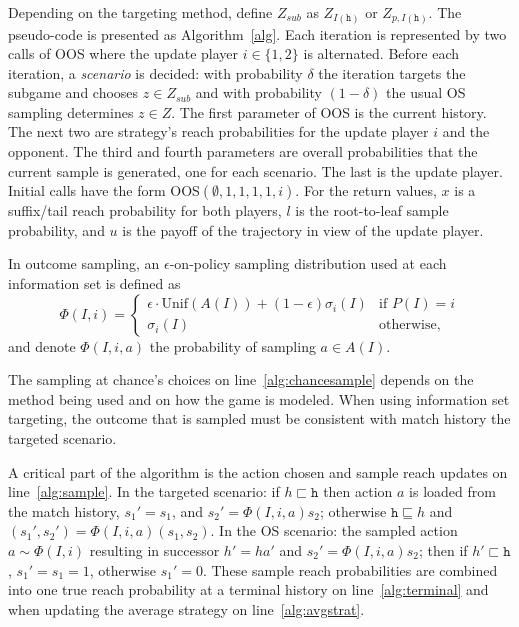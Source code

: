 \documentclass[letterpaper]{article}
\newcommand{\tth}{\mathtt{h}}
\begin{document}
Depending on the targeting method, define $Z_{sub}$ as $Z_{I(\tth)}$ or $Z_{p,I(\tth)}$. 
The pseudo-code is presented as Algorithm~\ref{alg}. 
Each iteration is represented by two calls of OOS where the update player $i \in \{1,2\}$ is alternated. 
Before each iteration, a {\it scenario} is decided: 
with probability $\delta$ the iteration targets the subgame and chooses $z \in Z_{sub}$
and with probability $(1-\delta)$ the usual OS sampling determines $z \in Z$. 
The first parameter of OOS is the current history. 
The next two are strategy's reach probabilities for the update player $i$ and the opponent. 
The third and fourth parameters are overall probabilities that the current sample is generated, one for each scenario. 
The last is the update player. Initial calls have the form OOS$(\emptyset, 1, 1, 1, 1, i)$.  
For the return values, $x$ is a suffix/tail reach probability for both players, 
$l$ is the root-to-leaf sample probability, and $u$ is the payoff of the trajectory in view 
of the update player. 

In outcome sampling, an $\epsilon$-on-policy sampling distribution used at each information set
is defined as 
\begin{equation*}
\label{eq:ossample}
\Phi(I,i) = \left\{
\begin{array}{ll}
\epsilon \cdot \mbox{Unif}(A(I)) + (1-\epsilon)\sigma_i(I) & \mbox{if } P(I) = i\\ 
\sigma_i(I)                                          & \mbox{otherwise,}
\end{array} \right.
\end{equation*}
and denote $\Phi(I,i,a)$ the probability of sampling $a \in A(I)$. 

The sampling at chance's choices on line~\ref{alg:chancesample} depends on the method being 
used and on how the game is modeled. When using information set targeting, the outcome that is sampled 
must be consistent with match history the targeted scenario. 

A critical part of the algorithm is the action chosen and sample reach updates on line~\ref{alg:sample}. 
In the targeted scenario: if $h \sqsubset \tth$ then action $a$ is loaded from the match history, $s_1' = s_1$, 
and $s_2' = \Phi(I,i,a) s_2$; otherwise $\tth \sqsubseteq h$ and $(s_1', s_2') = \Phi(I,i,a) (s_1, s_2)$. 
In the OS scenario: the sampled action $a \sim \Phi(I,i)$ resulting in successor $h' = ha'$ and $s_2' = \Phi(I,i,a) s_2$; 
then if $h' \sqsubset \tth$, $s_1' = s_1 = 1$, otherwise $s_1' = 0$. These sample reach probabilities are combined into 
one true reach probability at a terminal history on line~\ref{alg:terminal} and when updating the average 
strategy on line~\ref{alg:avgstrat}. 
\end{document}
